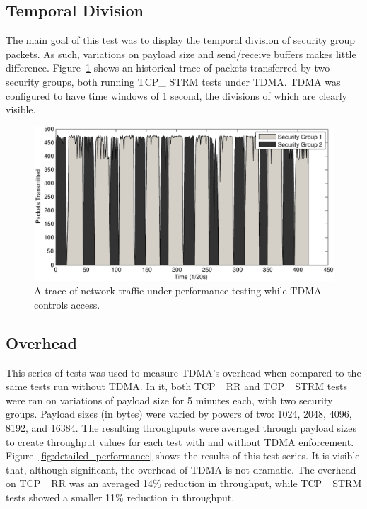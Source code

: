 \documentclass[oneside,12pt]{memoir}
\begin{document}
\subsection{Temporal Division}
The main goal of this test was to display the temporal division of security group packets. As such, variations on payload size and send/receive buffers makes little difference. Figure~\ref{fig:Switching} shows an historical trace of packets transferred by two security groups, both running TCP\_ STRM tests under TDMA. TDMA was configured to have time windows of 1 second, the divisions of which are clearly visible.
\begin{figure}
\centering
\includegraphics[scale=0.8]{Switching.pdf}
\caption{A trace of network traffic under performance testing while TDMA controls access.}
\label{fig:Switching}
\end{figure}

\subsection{Overhead}
This series of tests was used to measure TDMA's overhead when compared to the same tests run without TDMA. In it, both TCP\_ RR and TCP\_ STRM tests were ran on variations of payload size for 5 minutes each, with two security groups. Payload sizes (in bytes) were varied by powers of two: 1024, 2048, 4096, 8192, and 16384. The resulting throughputs were averaged through payload sizes to create throughput values for each test with and without TDMA enforcement.
Figure~\ref{fig:detailed_performance} shows the results of this test series. It is visible that, although significant, the overhead of TDMA is not dramatic. The overhead on TCP\_ RR was an averaged 14\% reduction in throughput, while TCP\_ STRM tests showed a smaller 11\% reduction in throughput. 
\end{document}
